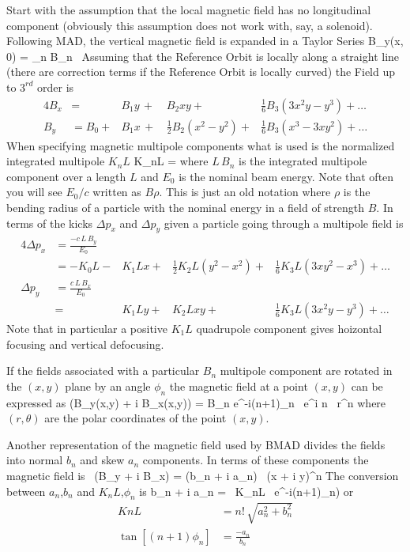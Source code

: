 Start with the assumption that the local magnetic field has no
longitudinal component (obviously this assumption does not work with,
say, a solenoid).  Following MAD, the vertical magnetic field is
expanded in a Taylor Series
\Begineq
  B_y(x, 0) = \sum_n B_n \, 
\Endeq
Assuming that the Reference Orbit is locally along a straight line
(there are correction terms if the Reference Orbit is locally curved) the 
Field up to $3^{rd}$ order is
\begin{alignat}{4}
  B_x &=        &B_1 y \, + \, &B_2 xy + 
                                   & \frac{1}{6} B_3 (3x^2 y - y^3) + \ldots \\
  B_y &= B_0 +  &B_1 x \, + \, & \frac{1}{2} B_2 (x^2 - y^2) + 
                                   & \frac{1}{6} B_3 (x^3 - 3x y^2) + \ldots
\end{alignat}
When specifying magnetic multipole components what is used is the
normalized integrated multipole $K_nL$
\Begineq
  K_nL = 
\Endeq
where $L \, B_n$ is the integrated multipole component over a length
$L$ and $E_0$ is the nominal beam energy. Note that often you will see
$E_0/c$ written as $B\rho$. This is just an old notation where $\rho$
is the bending radius of a particle with the nominal energy in a field
of strength $B$. In terms of the kicks $\Delta p_x$ and $\Delta p_y$
given a particle going through a multipole field is
\begin{alignat}{4}
  \Delta p_x &= \frac{-c\, L \, B_y}{E_0} \\
             &= -K_0L - &K_1L x + & \frac{1}{2} K_2L (y^2 - x^2) + 
                                & \frac{1}{6} K_3L (3x y^2 - x^3) + \ldots \\
  \Delta p_y &= \frac{c\, L \, B_x}{E_0} \\
             &=        &K_1L y + &K_2L xy + 
                                & \frac{1}{6} K_3L (3x^2 y - y^3) + \ldots 
\end{alignat}
Note that in particular a positive $K_1L$ quadrupole component gives
hoizontal focusing and vertical defocusing. 

If the fields associated with a particular $B_n$ multipole component
are rotated in the $(x, y)$ plane by an angle $\phi_n$ the magnetic
field at a point $(x,y)$ can be expressed as
\Begineq
  (B_y(x,y) + i B_x(x,y)) = 
                 B_n e^{-i(n+1)\phi_n} \, e^{i n \theta} \, r^n 
\Endeq
where $(r, \theta)$ are the polar coordinates of the point $(x, y)$.

Another representation of the magnetic field used by BMAD divides the
fields into normal $b_n$ and skew $a_n$ components. In terms of these
components the magnetic field is
\Begineq
   \, (B_y + i B_x) = (b_n + i a_n) \, (x + i y)^n
\Endeq
The conversion between $a_n$,$b_n$ and $K_nL$,$\phi_n$ is
\Begineq
  b_n + i a_n =  \, K_nL \, e^{-i(n+1)\phi_n)}
\Endeq
or
\begin{align}
  KnL &= n! \, \sqrt{a_n^2 + b_n^2} \\
  \tan[(n+1) \phi_n] &= \frac{-a_n}{b_n}
\end{align}

